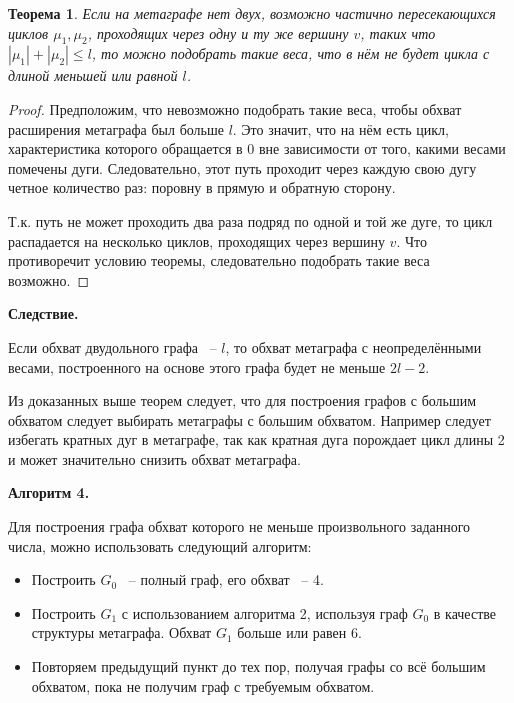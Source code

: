 \documentclass[14pt]{mmcs-article}
\newtheorem{theorem}{Теорема}
\begin{document}
\begin{theorem}

Если на метаграфе нет двух, возможно частично пересекающихся циклов $\mu_1, \mu_2$, проходящих через одну и ту же вершину $v$, таких что  $|\mu_1| + |\mu_2| \le l$, то можно подобрать такие веса, что в нём не будет цикла с длиной меньшей или равной $l$.

\end{theorem}

\begin{proof}

Предположим, что невозможно подобрать такие веса, чтобы обхват расширения метаграфа был больше $l$. Это значит, что на нём есть цикл, характеристика которого обращается в 0 вне зависимости от того, какими весами помечены дуги. Следовательно, этот путь проходит через каждую свою дугу четное количество раз: поровну в прямую и обратную сторону. 

Т.к. путь не может проходить два раза подряд по одной и той же дуге, то цикл распадается на несколько циклов, проходящих через вершину $v$. Что противоречит условию теоремы, следовательно подобрать такие веса возможно. 

\end{proof}

\textbf{Следствие.}

Если обхват двудольного графа ~-- $l$, то обхват метаграфа с неопределёнными весами, построенного на основе этого графа будет не меньше $2l - 2$. 

Из доказанных выше теорем следует, что для построения графов с большим обхватом следует выбирать метаграфы с большим обхватом. Например следует избегать кратных дуг в метаграфе, так как кратная дуга порождает цикл длины 2 и может значительно снизить обхват метаграфа.

\textbf{Алгоритм 4.}

Для построения графа обхват которого не меньше произвольного заданного числа, можно использовать следующий алгоритм:

\begin{itemize}
    \item Построить $G_0$ ~-- полный граф, его обхват ~-- 4.
    \item Построить $G_1$ с использованием алгоритма 2, используя граф $G_0$ в качестве структуры метаграфа. Обхват $G_1$ больше или равен 6.
    \item Повторяем предыдущий пункт до тех пор, получая графы со всё большим обхватом, пока не получим граф с требуемым обхватом.  
\end{itemize}
\end{document}
